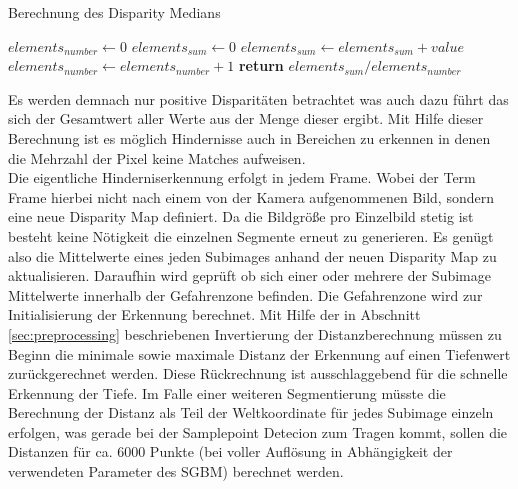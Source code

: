 \begin{algorithm}[h]
\caption{Berechnung des Disparity Medians}
\label{alg:mean_disparity_calculation}
\begin{algorithmic}[1]
        \State $elements_{number} \gets 0$
        \State $elements_{sum} \gets 0 $
                \State $elements_{sum} \gets elements_{sum} + value$
                \State $elements_{number} \gets elements_{number} + 1$
            \EndIf
        \EndFor
        \State \textbf{return} $elements_{sum} / elements_{number}$
    \EndProcedure
\end{algorithmic}  
\end{algorithm}

\noindent
Es werden demnach nur positive Disparitäten betrachtet was auch dazu führt das sich der Gesamtwert aller Werte aus der Menge dieser ergibt. Mit Hilfe dieser Berechnung ist es möglich Hindernisse auch in Bereichen zu erkennen in denen die Mehrzahl der Pixel keine Matches aufweisen.\\

\noindent
Die eigentliche Hinderniserkennung erfolgt in jedem Frame. Wobei der Term Frame hierbei nicht nach einem von der Kamera aufgenommenen Bild, sondern eine neue Disparity Map definiert. Da die Bildgröße pro Einzelbild stetig ist besteht keine Nötigkeit die einzelnen Segmente erneut zu generieren. Es genügt also die Mittelwerte eines jeden Subimages anhand der neuen Disparity Map zu aktualisieren. Daraufhin wird geprüft ob sich einer oder mehrere der Subimage Mittelwerte innerhalb der Gefahrenzone befinden. Die Gefahrenzone wird zur Initialisierung der Erkennung berechnet. Mit Hilfe der in Abschnitt \ref{sec:preprocessing} beschriebenen Invertierung der Distanzberechnung müssen zu Beginn die minimale sowie maximale Distanz der Erkennung auf einen Tiefenwert zurückgerechnet werden. Diese Rückrechnung ist ausschlaggebend für die schnelle Erkennung der Tiefe. Im Falle einer weiteren Segmentierung müsste die Berechnung der Distanz als Teil der Weltkoordinate für jedes Subimage einzeln erfolgen, was gerade bei der Samplepoint Detecion zum Tragen kommt, sollen die Distanzen für ca. $6000$ Punkte (bei voller Auflösung in Abhängigkeit der verwendeten Parameter des SGBM) berechnet werden.\\

